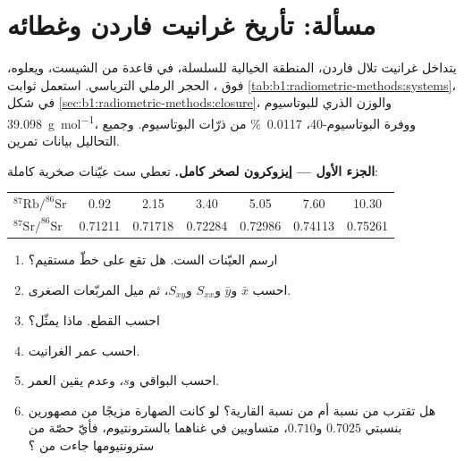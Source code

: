 \section{مسألة: تأريخ غرانيت فاردن وغطائه}

\begin{problem}
\label{pb:b1:radiometric-methods:1}
يتداخل غرانيت تلال فاردن، المنطقة الخيالية للسلسلة، في قاعدة من الشيست، ويعلوه، فوق ، الحجر الرملي الترياسي. استعمل ثوابت \cref{tab:b1:radiometric-methods:systems}،  في شكل \cref{sec:b1:radiometric-methods:closure}، والوزن الذري للبوتاسيوم \qty{39.098}{g.mol^{-1}}، ووفرة البوتاسيوم-40، \qty{0.0117}{\percent} من ذرّات البوتاسيوم. وجميع التحاليل بيانات تمرين.

\medskip
\noindent\textbf{الجزء الأول --- إيزوكرون لصخر كامل.} تعطي ست عيّنات صخرية كاملة:
\begin{center}
\small
\begin{tabular}{|l|cccccc|}
\hline
$^{87}\mathrm{Rb}/^{86}\mathrm{Sr}$ & 0.92 & 2.15 & 3.40 & 5.05 & 7.60 & 10.30 \\
$^{87}\mathrm{Sr}/^{86}\mathrm{Sr}$ & 0.71211 & 0.71718 & 0.72284 & 0.72986 & 0.74113 & 0.75261 \\
\hline
\end{tabular}
\end{center}
\begin{enumerate}
  \item ارسم العيّنات الست. هل تقع على خطّ مستقيم؟
  \item احسب $\bar x$ و$\bar y$ و$S_{xx}$ و$S_{xy}$، ثم ميل المربّعات الصغرى.
  \item احسب القطع. ماذا يمثّل؟
  \item احسب عمر الغرانيت.
  \item احسب البواقي و$s$، وعدم يقين العمر.
  \item هل تقترب  من نسبة  أم من نسبة  القارية؟ لو كانت الصهارة مزيجًا من مصهورين بنسبتي $0.7025$ و$0.710$، متساويين في غناهما بالسترونتيوم، فأيّ حصّة من سترونتيومها جاءت من ؟
\end{enumerate}


\end{problem}

